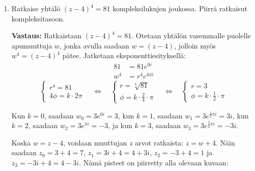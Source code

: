 \documentclass[a4paper,12pt]{article}
\begin{document}
\begin{enumerate}
\begin{center}
\end{center}

\item Ratkaise yht\"al\"o $(z-4)^4=81$ kompleksilukujen joukossa. Piirr\"a ratkaisut kompleksitasoon.

\textbf{Vastaus:} Ratkaistaan $(z-4)^4=81$. Otetaan yhtälön vasemmalle puolelle apumuuttuja $w$, jonka avulla saadaan $w=(z-4)$, jolloin myös $w^4=(z-4)^4$ pätee. Jatketaan eksponenttiesityksellä:
\begin{align*}
    81&=81e^{0i}\\
    w^4&=r^4e^{4\phi i}
\end{align*}
\[
\begin{cases}
    r^4=81\\
    4\phi = k\cdot 2\pi
\end{cases}
\quad \Longleftrightarrow \quad
\begin{cases}
    r=\sqrt[4]{81}\\
    \phi=k\cdot \frac{2}{4}\cdot \pi
\end{cases}
\quad \Longleftrightarrow \quad
\begin{cases}
    r=3\\
    \phi=k\cdot \frac{1}{2}\cdot \pi
\end{cases}
\]

Kun $k=0$, saadaan $w_0=3e^{0i}=3$, kun $k=1$, saadaan $w_1=3e^{\frac{1}{2}\pi i}=3i$, kun $k=2$, saadaan $w_2=3e^{\pi i}=-3$, ja kun $k=3$, saadaan $w_3=3e^{\frac{3}{2}\pi i}=-3i$. 

Koska $w=z-4$, voidaan muuttujan $z$ arvot ratkaista: $z=w+4$. Näin saadaan $z_0=3+4=7$, $z_1=3i+4=4+3i$, $z_2=-3+4=1$ ja $z_3=-3i+4=4-3i$. Nämä pisteet on piirretty alla olevaan kuvaan:

\begin{center}
\end{center}
\end{enumerate}
\end{document}
